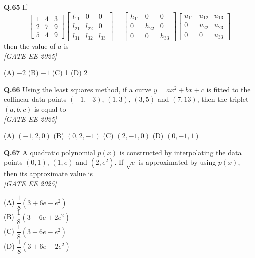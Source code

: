 \documentclass[11pt]{article}
\begin{document}
\begin{flushleft}
\textbf{Q.65} If 
\[
\begin{bmatrix}
1 & 4 & 3 \\
2 & 7 & 9 \\
5 & 4 & 9
\end{bmatrix}
\begin{bmatrix}
l_{11} & 0 & 0 \\
l_{21} & l_{22} & 0 \\
l_{31} & l_{32} & l_{33}
\end{bmatrix}
= 
\begin{bmatrix}
h_{11} & 0 & 0 \\
0 & h_{22} & 0 \\
0 & 0 & h_{33}
\end{bmatrix}
\begin{bmatrix}
u_{11} & u_{12} & u_{13} \\
0 & u_{22} & u_{23} \\
0 & 0 & u_{33}
\end{bmatrix}
\]
then the value of $a$ is
\\[1ex] \textit{[GATE EE 2025]}

(A) $-2$ \hspace{2em} (B) $-1$ \hspace{2em} (C) 1 \hspace{2em} (D) 2
\end{flushleft}

\begin{flushleft}
\textbf{Q.66} Using the least squares method, if a curve $y = ax^2 + bx + c$ is fitted to the collinear data points $(-1, -3)$, $(1, 3)$, $(3, 5)$ and $(7, 13)$, then the triplet $(a, b, c)$ is equal to
\\[1ex] \textit{[GATE EE 2025]}

(A) $(-1, 2, 0)$ \hspace{2em} (B) $(0, 2, -1)$ \hspace{2em} (C) $(2, -1, 0)$ \hspace{2em} (D) $(0, -1, 1)$
\end{flushleft}

\begin{flushleft}
\textbf{Q.67} A quadratic polynomial $p(x)$ is constructed by interpolating the data points $(0,1)$, $(1,e)$ and $(2,e^2)$. If $\sqrt{e}$ is approximated by using $p(x)$, then its approximate value is 
\\[1ex] \textit{[GATE EE 2025]}


(A) $\dfrac{1}{8} \left( 3 + 6e - e^2 \right)$ \\
(B) $\dfrac{1}{8} \left( 3 - 6e + 2e^2 \right)$ \\
(C) $\dfrac{1}{8} \left( 3 - 6e - e^2 \right)$ \\
(D) $\dfrac{1}{8} \left( 3 + 6e - 2e^2 \right)$
\end{flushleft}
\end{document}
